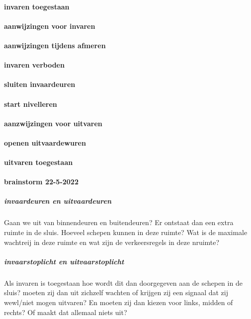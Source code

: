\paragraph{invaren toegestaan}

\paragraph{aanwijzingen voor invaren}
\paragraph{aanwijzingen tijdens afmeren}

\paragraph{invaren verboden}

\paragraph{sluiten invaardeuren}

\paragraph{start nivelleren}

\paragraph{aanzwijzingen voor uitvaren}
\paragraph{openen uitvaardewuren}

\paragraph{uitvaren toegestaan}




\paragraph{brainstorm 22-5-2022}

\subparagraph{invaardeuren en uitvaardeuren}
Gaan we uit van binnendeuren en buitendeuren? Er ontstaat dan een extra ruimte in de sluis. Hoeveel schepen kunnen in deze ruimte? Wat is de maximale wachtreij in deze ruimte en wat zijn de verkeersregels in deze nruimte?
\subparagraph{invaarstoplicht en uitvaarstoplicht}
Als invaren is toegestaan hoe wordt dit dan doorgegeven aan de schepen in de sluis? moeten zij dan uit zichzelf wachten of krijgen zij een signaal dat zij wewl/niet mogen uitvaren? En moeten zij dan kiezen voor links, midden of rechts? Of maakt dat allemaal niets uit?


